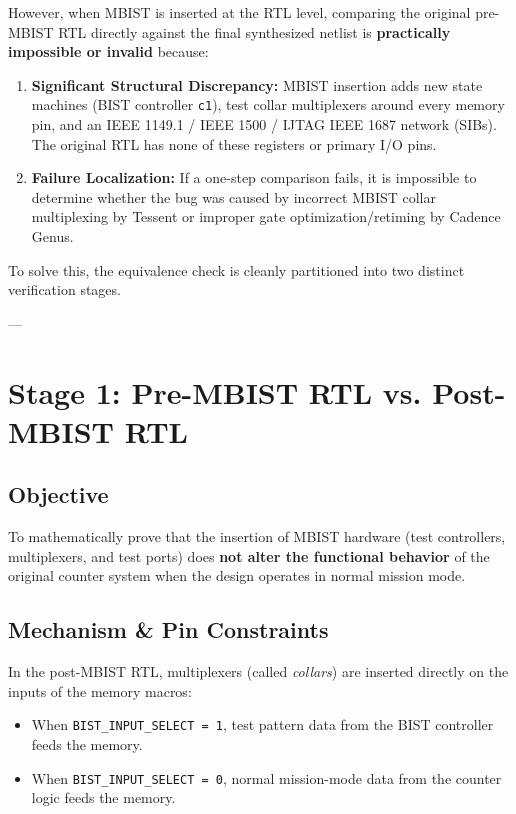 \documentclass[12pt]{article}
\begin{document}
However, when MBIST is inserted at the RTL level, comparing the original pre-MBIST RTL directly against the final synthesized netlist is \textbf{practically impossible or invalid} because:
\begin{enumerate}
    \item \textbf{Significant Structural Discrepancy:} MBIST insertion adds new state machines (BIST controller \texttt{c1}), test collar multiplexers around every memory pin, and an IEEE 1149.1 / IEEE 1500 / IJTAG IEEE 1687 network (SIBs). The original RTL has none of these registers or primary I/O pins.
    \item \textbf{Failure Localization:} If a one-step comparison fails, it is impossible to determine whether the bug was caused by incorrect MBIST collar multiplexing by Tessent or improper gate optimization/retiming by Cadence Genus.
\end{enumerate}

To solve this, the equivalence check is cleanly partitioned into two distinct verification stages.

---

\section{Stage 1: Pre-MBIST RTL vs. Post-MBIST RTL}

\subsection{Objective}
To mathematically prove that the insertion of MBIST hardware (test controllers, multiplexers, and test ports) does \textbf{not alter the functional behavior} of the original counter system when the design operates in normal mission mode.

\subsection{Mechanism \& Pin Constraints}
In the post-MBIST RTL, multiplexers (called \textit{collars}) are inserted directly on the inputs of the memory macros:
\begin{itemize}
    \item When \texttt{BIST\_INPUT\_SELECT = 1}, test pattern data from the BIST controller feeds the memory.
    \item When \texttt{BIST\_INPUT\_SELECT = 0}, normal mission-mode data from the counter logic feeds the memory.
\end{itemize}
\end{document}
